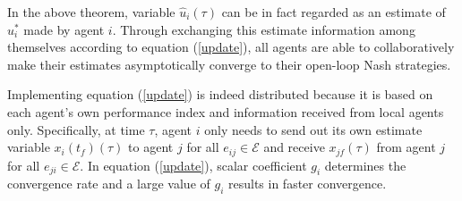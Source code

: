 \documentclass[12pt,draftcls,onecolumn]{IEEEtran}  %
\begin{document}
In the above theorem, variable $\hat{u}_i(\tau)$ can be in fact regarded as an estimate of $u_i^*$ made by agent $i$. Through exchanging this estimate information among themselves according to equation (\ref{update}), all agents are able to collaboratively make their estimates asymptotically converge to their open-loop Nash strategies. 

Implementing equation (\ref{update}) is indeed distributed because it is based on each agent's own performance index and information received from local agents only. Specifically, at time $\tau$, agent $i$ only needs to send out its own estimate variable $x_i(t_f)(\tau)$ to agent $j$ for all $e_{ij}\in\mathcal{E}$ and receive $x_{jf}(\tau)$ from agent $j$ for all $e_{ji}\in\mathcal{E}$. In equation (\ref{update}), scalar coefficient $g_i$ determines the convergence rate and a large value of $g_i$ results in faster convergence.
\end{document}
